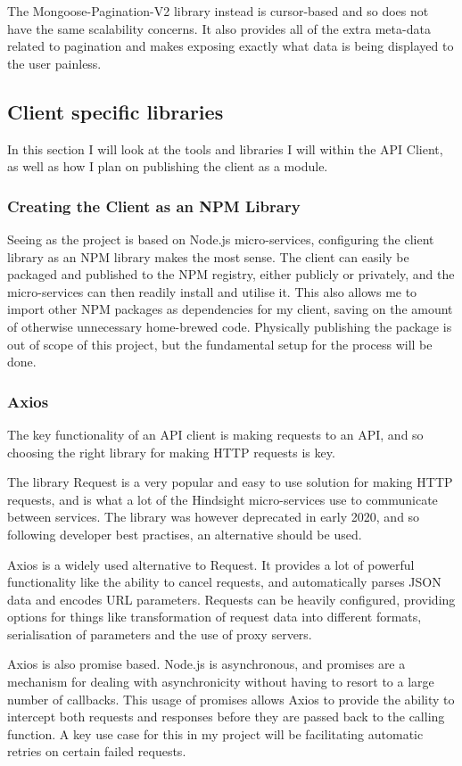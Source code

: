The Mongoose-Pagination-V2 library instead is cursor-based and so does not have the same scalability concerns. It also provides all of the extra meta-data related to pagination and makes exposing exactly what data is being displayed to the user painless.

\subsection{Client specific libraries}
In this section I will look at  the tools and libraries I will within the API Client, as well as how I plan on publishing the client as a module. 
\subsubsection{Creating the Client as an NPM Library}
Seeing as the project is based on Node.js micro-services, configuring the client library as an NPM library makes the most sense. The client can easily be packaged and published to the NPM registry, either publicly or privately, and the micro-services can then readily install and utilise it. This also allows me to import other NPM packages as dependencies for my client, saving on the amount of otherwise unnecessary home-brewed code. Physically publishing the package is out of scope of this project, but the fundamental setup for the process will be done.
\subsubsection{Axios}
The key functionality of an API client is making requests to an API, and so choosing the right library for making HTTP requests is key.

The library Request is a very popular and easy to use solution for making HTTP requests, and is what a lot of the Hindsight micro-services use to communicate between services. The library was however deprecated in early 2020, and so following developer best practises, an alternative should be used.

Axios is a widely used alternative to Request. It provides a lot of powerful functionality like the ability to cancel requests, and automatically parses JSON data and encodes URL parameters. Requests can be heavily configured, providing options for things like transformation of request data into different formats, serialisation of parameters and the use of proxy servers.

Axios is also promise based. Node.js is asynchronous, and promises are a mechanism for dealing with asynchronicity without having to resort to a large number of callbacks. This usage of promises allows Axios to provide the ability to intercept both requests and responses before they are passed back to the calling function. A key use case for this in my project will be facilitating automatic retries on certain failed requests. 
